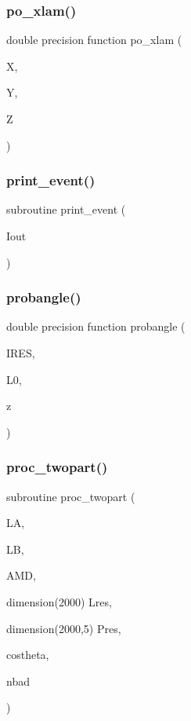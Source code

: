 \subsubsection{\texorpdfstring{po\+\_\+xlam()}{po\_xlam()}}
{\footnotesize\ttfamily double precision function po\+\_\+xlam (\begin{DoxyParamCaption}\item[{}]{X,  }\item[{}]{Y,  }\item[{}]{Z }\end{DoxyParamCaption})}

\mbox{\label{sophia_8f_a4dba7b185d8bae723bb5b14a71766036}} 
\subsubsection{\texorpdfstring{print\+\_\+event()}{print\_event()}}
{\footnotesize\ttfamily subroutine print\+\_\+event (\begin{DoxyParamCaption}\item[{}]{Iout }\end{DoxyParamCaption})}

\mbox{\label{sophia_8f_a159ac1bbac5e0c396a90500617a127f6}} 
\subsubsection{\texorpdfstring{probangle()}{probangle()}}
{\footnotesize\ttfamily double precision function probangle (\begin{DoxyParamCaption}\item[{}]{I\+R\+ES,  }\item[{}]{L0,  }\item[{}]{z }\end{DoxyParamCaption})}

\mbox{\label{sophia_8f_aa3ed293aaa5a3ef80078169868a3569e}} 
\subsubsection{\texorpdfstring{proc\+\_\+twopart()}{proc\_twopart()}}
{\footnotesize\ttfamily subroutine proc\+\_\+twopart (\begin{DoxyParamCaption}\item[{}]{LA,  }\item[{}]{LB,  }\item[{}]{A\+MD,  }\item[{dimension(2000)}]{Lres,  }\item[{dimension(2000,5)}]{Pres,  }\item[{}]{costheta,  }\item[{}]{nbad }\end{DoxyParamCaption})}

